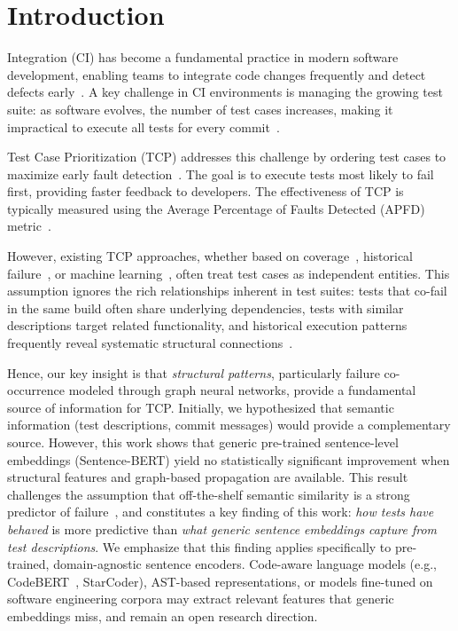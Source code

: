 \documentclass[10pt,journal,compsoc]{IEEEtran}
\begin{document}
\maketitle

\section{Introduction}
\label{sec:introduction}
 Integration (CI) has become a fundamental practice
in modern software development, enabling teams to integrate code changes frequently
and detect defects early~\cite{hilton2016usage, fowler2006continuous}. A key
challenge in CI environments is managing the growing test suite: as software
evolves, the number of test cases increases, making it impractical to execute
all tests for every commit~\cite{memon2017taming}.

Test Case Prioritization (TCP) addresses this challenge by ordering test cases
to maximize early fault detection~\cite{rothermel2001prioritizing, elbaum2002test}.
The goal is to execute tests most likely to fail first, providing faster feedback
to developers. The effectiveness of TCP is typically measured using the Average
Percentage of Faults Detected (APFD) metric~\cite{rothermel1999test}.

However, existing TCP approaches, whether based
on coverage~\cite{rothermel2001prioritizing}, historical failure~\cite{kim2002history},
or machine learning~\cite{spieker2017reinforcement, pan2022test}, often treat
test cases as independent entities. This assumption ignores the rich relationships
inherent in test suites: tests that co-fail in the same build often share underlying dependencies,
tests with similar descriptions target related functionality, and historical execution patterns
frequently reveal systematic structural connections~\cite{german2009evolution}.

Hence, our key insight is that \emph{structural patterns}, particularly failure
co-occurrence modeled through graph neural networks, provide a fundamental source of information
for TCP. Initially, we hypothesized that semantic information (test descriptions,
commit messages) would provide a complementary source. However, this work shows
that generic pre-trained sentence-level embeddings
(Sentence-BERT) yield no statistically significant improvement when
structural features and graph-based propagation are available. This
result challenges the assumption that off-the-shelf semantic similarity is a
strong predictor of failure~\cite{hernandes2025method}, and constitutes a
key finding of this work: \emph{how tests have behaved} is more predictive
than \emph{what generic sentence embeddings capture from test
descriptions}. We emphasize that this finding applies specifically to
pre-trained, domain-agnostic sentence encoders. Code-aware language models
(e.g., CodeBERT~\cite{feng2020codebert}, StarCoder), AST-based
representations, or models fine-tuned on software engineering corpora may
extract relevant features that generic embeddings miss, and remain an open
research direction.
\end{document}

